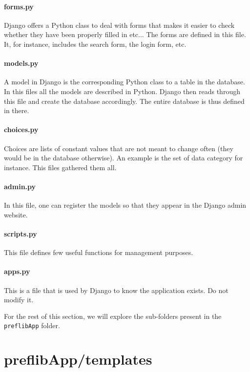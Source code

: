 \documentclass{report}
\begin{document}
	\paragraph{\faFileO{} forms.py} Django offers a Python class to deal with forms that makes it easier to check whether they have been properly filled in etc... The forms are defined in this file. It, for instance, includes the search form, the login form, etc.
	
	\paragraph{\faFileO{} models.py} A model in Django is the corresponding Python class to a table in the database. In this files all the models are described in Python. Django then reads through this file and create the database accordingly. The entire database is thus defined in there.
	
	\paragraph{\faFileO{} choices.py} Choices are lists of constant values that are not meant to change often (they would be in the database otherwise). An example is the set of data category for instance. This files gathered them all.
	
	\paragraph{\faFileO{} admin.py} In this file, one can register the models so that they appear in the Django admin website.
	
	\paragraph{\faFileO{} scripts.py} This file defines few useful functions for management purposes.
	
	\paragraph{\faFileO{} apps.py} This is a file that is used by Django to know the application exists. Do not modify it.
	
	\medskip
	
	For the rest of this section, we will explore the sub-folders present in the \texttt{preflibApp} folder.
	
	
	\section*{\faFolderO{} preflibApp/templates}
	
\end{document}
